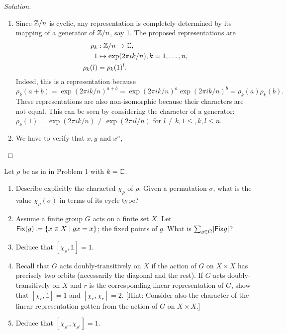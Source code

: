 \begin{proof}[Solution]
\hfill
\begin{enumerate}[font=\normalfont,label=\textbf{(\alph*)}, wide]
\item Since $\mathbb{Z}/n$ is cyclic, any representation is completely determined by its mapping of a generator of $\mathbb{Z}/n$, say 1. The proposed representations are
\[
\begin{aligned}
\rho_k &: \mathbb{Z}/n \to \mathbb{C}, \\
1 &\mapsto \exp(2\pi i k/n), k = 1, \ldots, n, \\
\rho_k(l) &= p_k(1)^l.
\end{aligned}
\]
Indeed, this is a representation because 
\[
\rho_k(a + b) = \exp(2\pi i k/n)^{a+b}= \exp(2\pi i k/n)^{a} \exp(2\pi i k/n)^{b} = \rho_k(a)\rho_k(b). 
\]
These representations are also non-isomorphic because their characters are not equal. This can be seen by considering the character of a generator: $\rho_k(1) = \exp(2\pi i k/n) \neq \exp(2\pi i l/n)$ for $l \neq k, 1 \leq, k, l \leq n$. 

\item We have to verify that $x, y$ and $x^n, $
\end{enumerate}
\end{proof}

\newpage



\begin{problem}
Let $\rho$ be as in in Problem 1 with $k = \mathbb{C}$. 
\begin{enumerate}[font=\normalfont,label=\textbf{(\alph*)}]

\item Describe explicitly the characted $\chi_\rho$ of $\rho$: Given a permutation $\sigma$, what is the value $\chi_\rho(\sigma)$ in terms of its cycle type?

\item Assume a finite group $G$ acts on a finite set $X$. Let $\mathsf{Fix} (g) \coloneqq \{x\in X\mid gx = x\}$; the fixed points of $g$. What is $\sum_{g\in G}\lvert \mathsf{Fix}{g}\rvert$?

\item Deduce that $[\chi_\rho, \mathbb{1}] = 1$. 
\item Recall that $G$ acts doubly-transitively on $X$ if the action of $G$ on $X \times X$ has precisely two orbits (necessarily the diagonal and the rest). If $G$ acts doubly-transitively on $X$ and $r$ is the corresponding linear representation of $G$, show that $[\chi_r, \mathbb{1}] = 1 $ and $[\chi_r, \chi_r] = 2$. [Hint: Consider also the character of the linear representation gotten from the action of $G$ on $X\times X$.]

\item Deduce that $[\chi_{\rho'}, \chi_{\rho'}] =1$. 
\end{enumerate}
\end{problem}

